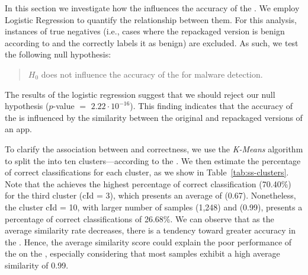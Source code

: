 In this section we investigate how the \sscore influences the accuracy of the \mas. We employ
Logistic Regression to quantify the relationship between them. For this analysis, instances of true
negatives (i.e., cases where the repackaged version is benign according to \vt and the \mas
correctly labels it as benign) are excluded.
As such, we test the following null hypothesis:

\begin{quote}
  {\bf $H_0$} \sscore does not influence the accuracy of the
  \mas for malware detection. 
\end{quote}

The results of the logistic regression suggest that we should reject our null hypothesis ($p$-value $=$ $2.22\cdot10^{-16}$).
This finding indicates that the accuracy of the \mas is influenced by the similarity between the original and repackaged versions
of an app.






To clarify the association between
\sscore and correctness, we use the \emph{K-Means} algorithm to split the
\cds into ten clusters---according to the \sscore. We then
estimate the percentage of correct classifications for each cluster, as
we show in Table~\ref{tab:ss-clusters}. Note that the \mas
achieves the highest percentage of correct classification (70.40\%) for the third cluster (cId = 3), which
presents an average \sscore of (0.67). Nonetheless, the
cluster cId = 10, with larger number of samples (1,248) and \sscore (0.99), presents a percentage of correct classifications of 26.68\%. We can observe that as the average similarity rate decreases, there is a tendency toward greater accuracy in the \mas. Hence, the average similarity score could explain the poor performance of the \mas on the \cds, especially considering that most samples exhibit a high average similarity of 0.99.

